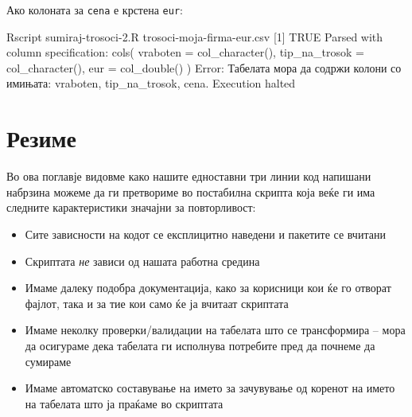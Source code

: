 \documentclass[
]{book}
\newenvironment{Shaded}{\begin{snugshade}}{\end{snugshade}}
\newcommand{\ExtensionTok}[1]{#1}
\newcommand{\NormalTok}[1]{#1}
\newcommand{\StringTok}[1]{\textcolor[rgb]{0.31,0.60,0.02}{#1}}
\providecommand{\tightlist}{%
  \setlength{\itemsep}{0pt}\setlength{\parskip}{0pt}}
\begin{document}
Ако колоната за \texttt{cena} е крстена \texttt{eur}:

\begin{Shaded}
\begin{Highlighting}[]
\ExtensionTok{Rscript}\NormalTok{ sumiraj{-}trosoci{-}2.R trosoci{-}moja{-}firma{-}eur.csv}
\NormalTok{[}\ExtensionTok{1}\NormalTok{] TRUE}
\ExtensionTok{Parsed}\NormalTok{ with column specification:}
\ExtensionTok{cols}\NormalTok{(}
  \ExtensionTok{vraboten}\NormalTok{ = col\_character(),}
  \ExtensionTok{tip\_na\_trosok}\NormalTok{ = col\_character(),}
  \ExtensionTok{eur}\NormalTok{ = col\_double()}
\NormalTok{)}
\ExtensionTok{Error}\NormalTok{: Табелата мора да содржи колони со имињата: }\StringTok{\textquotesingle{}vraboten\textquotesingle{}}\NormalTok{, }\StringTok{\textquotesingle{}tip\_na\_trosok\textquotesingle{}}\NormalTok{, }\StringTok{\textquotesingle{}cena\textquotesingle{}}\NormalTok{.}
\ExtensionTok{Execution}\NormalTok{ halted}
\end{Highlighting}
\end{Shaded}

\hypertarget{ux440ux435ux437ux438ux43cux435-2}{%
\section{Резиме}\label{ux440ux435ux437ux438ux43cux435-2}}

Во ова поглавје видовме како нашите едноставни три линии код напишани набрзина можеме да ги претвориме во постабилна скрипта која веќе ги има следните карактеристики значајни за повторливост:

\begin{itemize}
\tightlist
\item
  Сите зависности на кодот се експлицитно наведени и пакетите се вчитани\\
\item
  Скриптата \emph{не} зависи од нашата работна средина\\
\item
  Имаме далеку подобра документација, како за корисници кои ќе го отворат фајлот, така и за тие кои само ќе ја вчитаат скриптата\\
\item
  Имаме неколку проверки/валидации на табелата што се трансформира -- мора да осигураме дека табелата ги исполнува потребите пред да почнеме да сумираме\\
\item
  Имаме автоматско составување на името за зачувување од коренот на името на табелата што ја праќаме во скриптата
\end{itemize}
\end{document}
